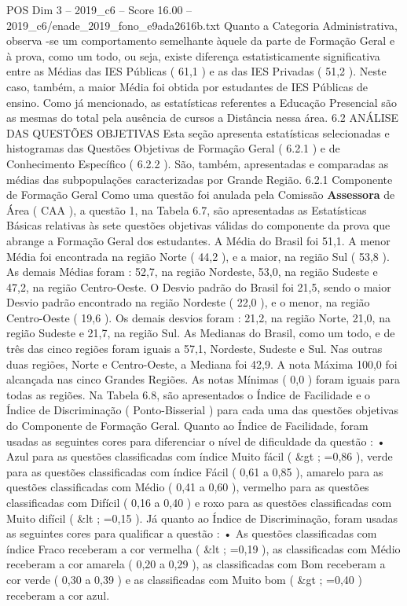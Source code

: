 \begin{textsample}{POS Dim 3 – 2019\_c6 – Score 16.00 – 2019\_c6/enade\_2019\_fono\_e9ada2616b.txt}
Quanto a Categoria Administrativa, observa -se um comportamento semelhante àquele da parte de Formação Geral e à prova, como um todo, ou seja, existe diferença estatisticamente significativa entre as Médias das IES Públicas ( 61,1 ) e as das IES Privadas ( 51,2 ).
Neste caso, também, a maior Média foi obtida por estudantes de IES Públicas de ensino.
Como já mencionado, as estatísticas referentes a Educação Presencial são as mesmas do total pela ausência de cursos a Distância nessa área. 6.2 ANÁLISE DAS QUESTÕES OBJETIVAS Esta seção apresenta estatísticas selecionadas e histogramas das Questões Objetivas de Formação Geral ( 6.2.1 ) e de Conhecimento Específico ( 6.2.2 ).
São, também, apresentadas e comparadas as médias das subpopulações caracterizadas por Grande Região. 6.2.1 Componente de Formação Geral Como uma questão foi anulada pela Comissão \textbf{Assessora} de Área ( CAA ), a questão 1, na Tabela 6.7, são apresentadas as Estatísticas Básicas relativas às sete questões objetivas válidas do componente da prova que abrange a Formação Geral dos estudantes.
A Média do Brasil foi 51,1.
A menor Média foi encontrada na região Norte ( 44,2 ), e a maior, na região Sul ( 53,8 ).
As demais Médias foram : 52,7, na região Nordeste, 53,0, na região Sudeste e 47,2, na região Centro-Oeste.
O Desvio padrão do Brasil foi 21,5, sendo o maior Desvio padrão encontrado na região Nordeste ( 22,0 ), e o menor, na região Centro-Oeste ( 19,6 ).
Os demais desvios foram : 21,2, na região Norte, 21,0, na região Sudeste e 21,7, na região Sul.
As Medianas do Brasil, como um todo, e de três das cinco regiões foram iguais a 57,1, Nordeste, Sudeste e Sul.
Nas outras duas regiões, Norte e Centro-Oeste, a Mediana foi 42,9.
A nota Máxima 100,0 foi alcançada nas cinco Grandes Regiões.
As notas Mínimas ( 0,0 ) foram iguais para todas as regiões.
Na Tabela 6.8, são apresentados o Índice de Facilidade e o Índice de Discriminação ( Ponto-Bisserial ) para cada uma das questões objetivas do Componente de Formação Geral.
Quanto ao Índice de Facilidade, foram usadas as seguintes cores para diferenciar o nível de dificuldade da questão : • Azul para as questões classificadas com índice Muito fácil ( \&gt ; =0,86 ), verde para as questões classificadas com índice Fácil ( 0,61 a 0,85 ), amarelo para as questões classificadas com Médio ( 0,41 a 0,60 ), vermelho para as questões classificadas com Difícil ( 0,16 a 0,40 ) e roxo para as questões classificadas com Muito difícil ( \&lt ; =0,15 ).
Já quanto ao Índice de Discriminação, foram usadas as seguintes cores para qualificar a questão : • As questões classificadas com índice Fraco receberam a cor vermelha ( \&lt ; =0,19 ), as classificadas com Médio receberam a cor amarela ( 0,20 a 0,29 ), as classificadas com Bom receberam a cor verde ( 0,30 a 0,39 ) e as classificadas com Muito bom ( \&gt ; =0,40 ) receberam a cor azul.

\end{textsample}
